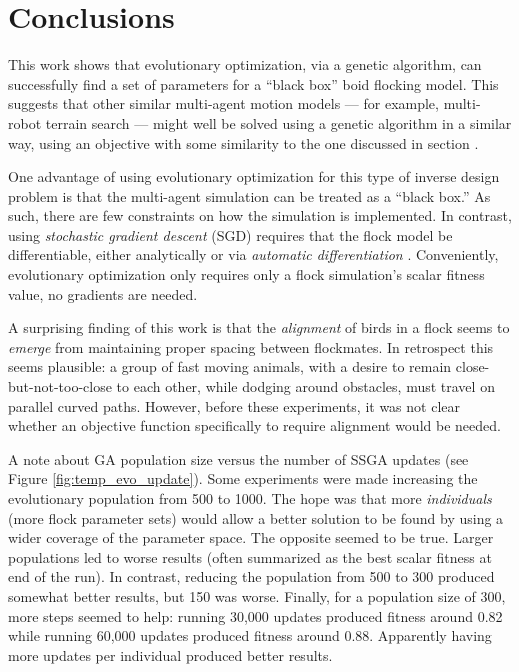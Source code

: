 \documentclass[letterpaper]{article}
\begin{document}

\section{Conclusions}
\label{sec:Conclusions}

This work shows that evolutionary optimization, via a genetic algorithm, can successfully find a set of parameters for a ``black box'' boid flocking model. This suggests that other similar multi-agent motion models --- for example, multi-robot terrain search --- might well be solved using a genetic algorithm in a similar way, using an objective with some similarity to the one discussed in section .

One advantage of using evolutionary optimization for this type of inverse design problem is that the multi-agent simulation can be treated as a ``black box.'' As such, there are few constraints on how the simulation is implemented. In contrast, using \textit{stochastic gradient descent} (SGD) \citep{robbins_stochastic_1951} requires that the flock model be differentiable, either analytically or via \textit{automatic differentiation} \citep{baydin_automatic_2018}. Conveniently, evolutionary optimization only requires only a flock simulation's scalar fitness value, no gradients are needed.

A surprising finding of this work is that the \textit{alignment} of birds in a flock seems to \textit{emerge} from maintaining proper spacing between flockmates. In retrospect this seems plausible: a group of fast moving animals, with a desire to remain close-but-not-too-close to each other, while dodging around obstacles, must travel on parallel curved paths. However, before these experiments, it was not clear whether an objective function specifically to require alignment would be needed.

A note about GA population size versus the number of SSGA updates (see Figure \ref{fig:temp_evo_update}). Some experiments were made increasing the evolutionary population from 500 to 1000. The hope was that more \textit{individuals} (more flock parameter sets) would allow a better solution to be found by using a wider coverage of the parameter space. The opposite seemed to be true. Larger populations led to worse results (often summarized as the best scalar fitness at end of the run). In contrast, reducing the population from 500 to 300 produced somewhat better results, but 150 was worse. Finally, for a population size of 300, more steps seemed to help: running 30,000 updates produced fitness around 0.82 while running 60,000 updates produced fitness around 0.88. Apparently having more updates per individual produced better results.
\end{document}
